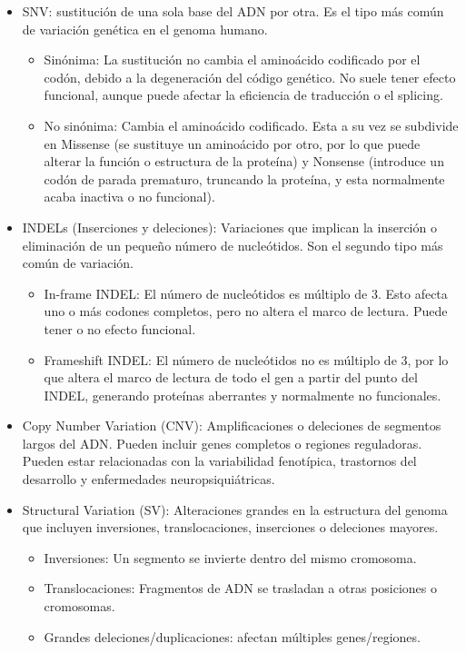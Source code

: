 \documentclass[11pt,spanish,listoffigures,listoftables]{tfgetsinf}
\begin{document}
\begin{itemize}
   \item SNV: sustitución de una sola base del \acs{ADN} por otra. Es el tipo más común de variación genética en el genoma humano. 
   \begin{itemize}
      \item Sinónima: La sustitución no cambia el aminoácido codificado por el codón, debido a la degeneración del código genético. No suele tener efecto funcional, aunque puede afectar la eficiencia de traducción o el splicing. 
      \item No sinónima: Cambia el aminoácido codificado. Esta a su vez se subdivide en Missense (se sustituye un aminoácido por otro, por lo que puede alterar la función o estructura de la proteína) y Nonsense (introduce un codón de parada prematuro, truncando la proteína, y esta normalmente acaba inactiva o no funcional). 
   \end{itemize}
   
   \item  \acs{INDEL}s (Inserciones y deleciones): Variaciones que implican la inserción o eliminación de un pequeño número de nucleótidos. Son el segundo tipo más común de variación.
   \begin{itemize}
      \item In-frame \acs{INDEL}: El número de nucleótidos es múltiplo de 3. Esto afecta uno o más codones completos, pero no altera el marco de lectura. Puede tener o no efecto funcional. 
      \item Frameshift \acs{INDEL}: El número de nucleótidos no es múltiplo de 3, por lo que altera el marco de lectura de todo el gen a partir del punto del \acs{INDEL}, generando proteínas aberrantes y normalmente no funcionales. 
   \end{itemize}
   \item Copy Number Variation (\acs{CNV}): Amplificaciones o deleciones de segmentos largos del \acs{ADN}. Pueden incluir genes completos o regiones reguladoras. Pueden estar relacionadas con la variabilidad fenotípica, trastornos del desarrollo y enfermedades neuropsiquiátricas\cite{ZHA}.
   \item Structural Variation (\acs{SV}): Alteraciones grandes en la estructura del genoma que incluyen inversiones, translocaciones, inserciones o deleciones mayores.
   \begin{itemize}
      \item Inversiones: Un segmento se invierte dentro del mismo cromosoma. 
      \item Translocaciones: Fragmentos de \acs{ADN} se trasladan a otras posiciones o cromosomas.
      \item Grandes deleciones/duplicaciones: afectan múltiples genes/regiones. 
   \end{itemize}
\end{itemize}
\end{document}
